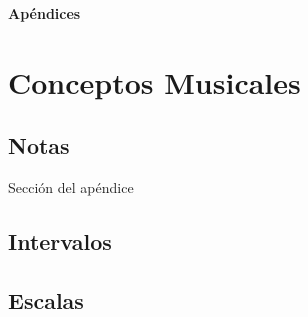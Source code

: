 \documentclass[12pt,twoside,titlepage]{report}
\newcommand\blankpage{%
    \newpage
    \null
    \thispagestyle{empty}%
    \newpage}
\begin{document}
{}
\footnotesize{
%


}
\raggedbottom
\afterpage{\blankpage}
\newpage



\appendix
{}
{}
\mbox{}
\vfill
\begin{center}
\begin{Huge}
\textbf{Apéndices}
\end{Huge}
\end{center}
\vfill
\mbox{}
\thispagestyle{empty}
\newpage
\mbox{}
\thispagestyle{empty}
\newpage

\chapter{Conceptos Musicales}
\label{sec:apendice}

\section{Notas}

Sección del apéndice

\section{Intervalos}
\section{Escalas}






\end{document}
